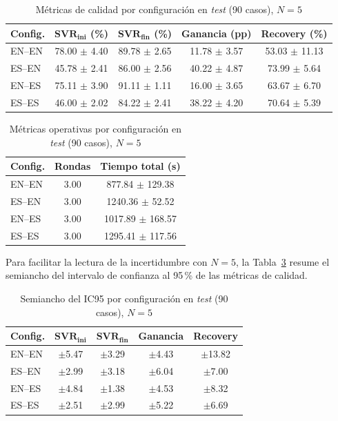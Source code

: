 \begin{table}[H]
\centering
\small
\caption{Métricas de calidad por configuración en \textit{test} (90 casos), $N=5$}
\label{tab:resultados-calidad-test90}
\begin{tabular}{lcccc}
\hline
\textbf{Config.} & $\mathbf{SVR_{ini}}$ (\%) & $\mathbf{SVR_{fin}}$ (\%) & \textbf{Ganancia} (pp) & \textbf{Recovery} (\%) \\
\hline
EN--EN & 78.00 $\pm$ 4.40 & 89.78 $\pm$ 2.65 & 11.78 $\pm$ 3.57 & 53.03 $\pm$ 11.13 \\
ES--EN & 45.78 $\pm$ 2.41 & 86.00 $\pm$ 2.56 & 40.22 $\pm$ 4.87 & 73.99 $\pm$ 5.64 \\
EN--ES & 75.11 $\pm$ 3.90 & 91.11 $\pm$ 1.11 & 16.00 $\pm$ 3.65 & 63.67 $\pm$ 6.70 \\
ES--ES & 46.00 $\pm$ 2.02 & 84.22 $\pm$ 2.41 & 38.22 $\pm$ 4.20 & 70.64 $\pm$ 5.39 \\
\hline
\end{tabular}
\end{table}

\begin{table}[H]
\centering
\caption{Métricas operativas por configuración en \textit{test} (90 casos), $N=5$}
\label{tab:resultados-operativos-test90}
\begin{tabular}{lcc}
\hline
\textbf{Config.} & \textbf{Rondas} & \textbf{Tiempo total (s)} \\
\hline
EN--EN & 3.00 & 877.84 $\pm$ 129.38 \\
ES--EN & 3.00 & 1240.36 $\pm$ 52.52 \\
EN--ES & 3.00 & 1017.89 $\pm$ 168.57 \\
ES--ES & 3.00 & 1295.41 $\pm$ 117.56 \\
\hline
\end{tabular}
\end{table}

Para facilitar la lectura de la incertidumbre con $N=5$, la Tabla~\ref{tab:resultados-ic95-test90} resume el semiancho del intervalo de confianza al 95\,\% de las métricas de calidad.

\begin{table}[H]
\centering
\caption{Semiancho del IC95 por configuración en \textit{test} (90 casos), $N=5$}
\label{tab:resultados-ic95-test90}
\begin{tabular}{lcccc}
\hline
\textbf{Config.} & $\mathbf{SVR_{ini}}$ & $\mathbf{SVR_{fin}}$ & \textbf{Ganancia} & \textbf{Recovery} \\
\hline
EN--EN & $\pm$5.47 & $\pm$3.29 & $\pm$4.43 & $\pm$13.82 \\
ES--EN & $\pm$2.99 & $\pm$3.18 & $\pm$6.04 & $\pm$7.00 \\
EN--ES & $\pm$4.84 & $\pm$1.38 & $\pm$4.53 & $\pm$8.32 \\
ES--ES & $\pm$2.51 & $\pm$2.99 & $\pm$5.22 & $\pm$6.69 \\
\hline
\end{tabular}
\end{table}

